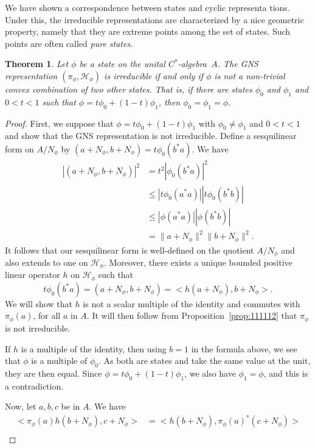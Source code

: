\documentclass{book}
\newtheorem{theorem}[definition]{Theorem}
\def\cstar{\(C^*\)-algebra}
\begin{document}
We have shown a correspondence between states and cyclic representa
tions. Under this, the irreducible representations are characterized by a nice
geometric property, namely that they are extreme points among the set of
states. Such points are often called \textit{pure states}.
\begin{theorem}\label{theorem:1127}
  Let \(\phi\) be a state on the unital \cstar\ \(A\). The GNS
  representation \((\pi_\phi,\mathcal{H}_\phi)\) is irreducible if and only if \(\phi\) is not a non-trivial
  convex combination of two other states. That is, if there are states \(\phi_0\) and
  \(\phi_1\) and \(0 < t <1\) such that \(\phi = t\phi_0 +(1 -t)\phi_1\), then \(\phi_0 = \phi_1 = \phi\).
\end{theorem}
\begin{proof}
  First, we suppose that \(\phi = t\phi_0+(1-t)\phi_1\) with \(\phi_0\neq \phi_1\) and \(0 < t < 1\)
  and show that the GNS representation is not irreducible. Define a sesquilinear
  form on \(A/N_\phi\) by \((a+N_\phi,b+N_\phi) = t\phi_0(b^*a)\). We have
  \begin{align*}
    |(a + N_\phi,b+N_\phi)|^2 &= t^2|\phi_0(b^*a)|^2\\
    &\leq |t\phi_0(a^*a)||t\phi_0(b^*b)|\\
    &\leq |\phi(a^*a)||\phi(b^*b)|\\
    &= \|a+N_\phi\|^2 \|b+N_\phi\|^2.
  \end{align*}
  It follows that our sesquilinear form is well-defined on the quotient \(A/N_\phi\) and
  also extends to one on \(\mathcal{H}_\phi\). Moreover, there exists a unique bounded positive
  linear operator \(h\) on \(\mathcal{H}_\phi\) such that
  \[t\phi_0(b^*a) = (a + N_\phi,b+N_\phi) =< h(a+N_\phi),b+N_\phi > .\]
  We will show that \(h\) is not a scalar multiple of the identity and commutes
  with \(\pi_\phi(a)\), for all \(a\) in \(A\). It will then follow from Proposition~\ref{prop:111112} that
  \(\pi_\phi\) is not irreducible.\par
  If \(h\) is a multiple of the identity, then using \(b = 1\) in the formula above,
  we see that \(\phi\) is a multiple of \(\phi_0\). As both are states and take the same value
  at the unit, they are then equal. Since \(\phi = t\phi_0 + {(1 - t)}\phi_1\), we also have
  \(\phi_1 = \phi\), and this is a contradiction.\par
  Now, let \(a,b,c\) be in \(A\). We have
  \begin{align*}
    <\pi_\phi(a)h(b +N_\phi),c+N_\phi > &= <h(b+N_\phi),{\pi_\phi(a)}^*(c+N_\phi) >\\

\end{align*}
\end{proof}
\end{document}
